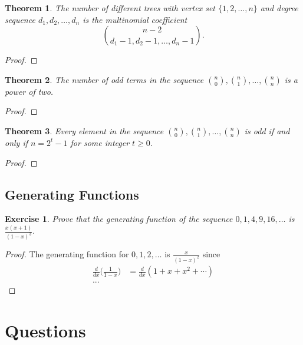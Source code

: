 \documentclass[12]{article}
\newcounter{exerciseCounter}
\newtheorem{thm}{Theorem}[section] %
\newtheorem{ex}[exerciseCounter]{Exercise}
\theoremstyle{definition}
\begin{document}
	\begin{thm}
		The number of different trees with vertex set $\{1, 2, \ldots, n\}$ and degree sequence $d_1, d_2, \ldots, d_n$ is the multinomial coefficient
		$${n-2 \choose d_1-1, d_2-1, \ldots, d_n-1}.$$
	\end{thm}
	\begin{proof}
		
	\end{proof}
	\begin{thm}
		The number of odd terms in the sequence ${n \choose 0}, {n \choose 1}, \ldots, {n \choose n}$ is a power of two.
	\end{thm}
	\begin{proof}
		
	\end{proof}

	\begin{thm}
		Every element in the sequence ${n \choose 0}, {n \choose 1}, \ldots, {n \choose n}$ is odd if and only if $n = 2^t - 1$ for some integer $t \geq 0$.
	\end{thm}
	\begin{proof}
		
	\end{proof}

	\subsection{Generating Functions}
	
	\begin{ex}
		Prove that the generating function of the sequence $0, 1, 4, 9, 16, \ldots$ is $\frac{x(x+1)}{(1-x)^3}.$
	\end{ex}
	\begin{proof}
		The generating function for $0, 1, 2, \ldots$ is $\frac{x}{(1-x)^2}$ since 
		\begin{align*}
			\frac{d}{dx}\big(\frac{1}{1-x} \big) &= \frac{d}{dx}(1 + x + x^2 + \cdots)	\\
			...
		\end{align*}
	\end{proof}
	
	\section{Questions}
	
\end{document}
